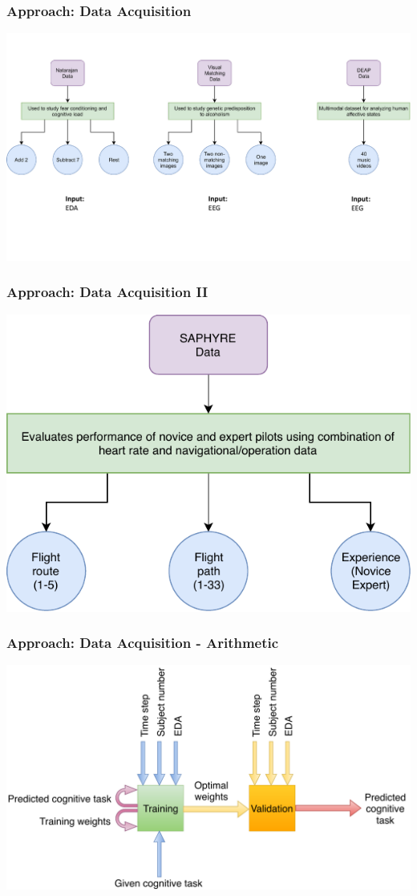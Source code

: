 \documentclass{beamer}
\begin{document}
\begin{frame}
\frametitle{Approach: Data Acquisition}
\includegraphics[width=\textwidth]{data}
\end{frame}

\begin{frame}
\frametitle{Approach: Data Acquisition II}
\begin{center}
\includegraphics[width=.75\textwidth]{saphyre}
\end{center}
\end{frame}

\begin{frame}
\frametitle{Approach: Data Acquisition - Arithmetic}
\includegraphics[width=\textwidth]{nata-io}
\end{frame}
\end{document}
